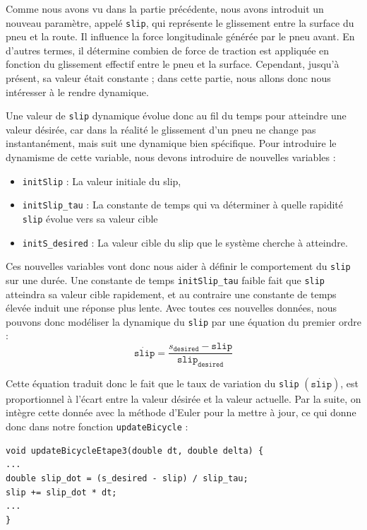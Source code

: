 Comme nous avons vu dans la partie précédente, nous avons introduit un nouveau paramètre, appelé \texttt{slip}, qui représente le glissement entre la surface du pneu et la route. Il influence la force longitudinale générée par le pneu avant. En d'autres termes, il détermine combien de force de traction est appliquée en fonction du glissement effectif entre le pneu et la surface. Cependant, jusqu'à présent, sa valeur était constante ; dans cette partie, nous allons donc nous intéresser à le rendre dynamique.

Une valeur de \texttt{slip} dynamique évolue donc au fil du temps pour atteindre une valeur désirée, car dans la réalité le glissement d'un pneu ne change pas instantanément, mais suit une dynamique bien spécifique. Pour introduire le dynamisme de cette variable, nous devons introduire de nouvelles variables :

\begin{itemize}
\item \texttt{initSlip} : La valeur initiale du slip,

\item \texttt{initSlip\_tau} : La constante de temps qui va déterminer à quelle rapidité \texttt{slip} évolue vers sa valeur cible

\item \texttt{initS\_desired} : La valeur cible du slip que le système cherche à atteindre.

\end{itemize}

Ces nouvelles variables vont donc nous aider à définir le comportement du \texttt{slip} sur une durée. Une constante de temps \texttt{initSlip\_tau} faible fait que \texttt{slip} atteindra sa valeur cible rapidement, et au contraire une constante de temps élevée induit une réponse plus lente. Avec toutes ces nouvelles données, nous pouvons donc modéliser la dynamique du \texttt{slip} par une équation du premier ordre :
$$\dot{\texttt{slip}} = \frac{s_{\texttt{desired}} - \texttt{slip}}{\texttt{slip}_{\texttt{desired}}}$$

Cette équation traduit donc le fait que le taux de variation du \texttt{slip} $(\dot{\texttt{slip}})$, est proportionnel à l'écart entre la valeur désirée et la valeur actuelle. Par la suite, on intègre cette donnée avec la méthode d'Euler pour la mettre à jour, ce qui donne donc dans notre fonction \texttt{updateBicycle} :

\begin{lstlisting}[style=CStyle]
void updateBicycleEtape3(double dt, double delta) {
...
double slip_dot = (s_desired - slip) / slip_tau;
slip += slip_dot * dt;
...
}
\end{lstlisting}


